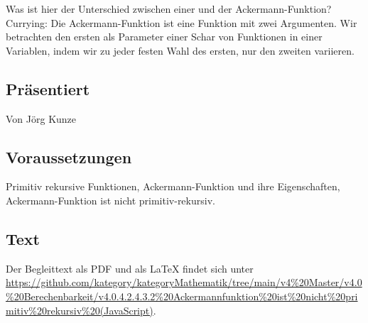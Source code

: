 \documentclass[a4paper]{amsart}
\theoremstyle{definition}
\begin{document}
Was ist hier der Unterschied zwischen einer und der Ackermann-Funktion? Currying: Die Ackermann-Funktion ist eine Funktion mit zwei Argumenten. Wir betrachten den ersten als Parameter einer Schar von Funktionen in einer Variablen, indem wir zu jeder festen Wahl des ersten, nur den zweiten variieren.  

\subsection*{Präsentiert}
Von Jörg Kunze

\subsection*{Voraussetzungen}
Primitiv rekursive Funktionen, Ackermann-Funktion und ihre Eigenschaften, Ackermann-Funktion ist nicht primitiv-rekursiv.

\subsection*{Text}
Der Begleittext als PDF und als LaTeX findet sich unter
\url{https://github.com/kategory/kategoryMathematik/tree/main/v4%20Master/v4.0%20Berechenbarkeit/v4.0.4.2.4.3.2%20Ackermannfunktion%20ist%20nicht%20primitiv%20rekursiv%20(JavaScript)}.

\end{document}
